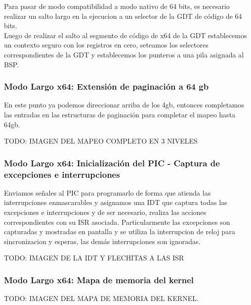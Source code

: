     Para pasar de modo compatibilidad a modo nativo de 64 bits, es necesario realizar un salto largo en la ejecucion a un selector de la GDT de código de 64 bits.\\
    Luego de realizar el salto al segmento de código de x64 de la GDT establecemos un contexto seguro con los registros en cero, seteamos los selectores correspondientes de la GDT y establecemos los punteros a una pila asignada al BSP.

    \subsubsection{Modo Largo x64: Extensión de paginación a 64 gb}

    En este punto ya podemos direccionar arriba de los 4gb, entonces completamos las entradas en las estructuras de paginación para completar el mapeo hasta 64gb.

    TODO: IMAGEN DEL MAPEO COMPLETO EN 3 NIVELES

    \subsubsection{Modo Largo x64: Inicialización del PIC - Captura de excepciones e interrupciones}
	
    Enviamos señales al PIC para programarlo de forma que atienda las interrupciones enmascarables y asignamos una IDT que captura todas las excepciones e interrupciones y de ser necesario, realiza las acciones correspondientes con su ISR asociada. Particularmente las excepciones son capturadas y mostradas en pantalla y se utiliza la interrupcion de reloj para sincronizacion y esperas, las demás interrupciones son ignoradas.

    TODO: IMAGEN DE LA IDT Y FLECHITAS A LAS ISR

    \subsubsection{Modo Largo x64: Mapa de memoria del kernel}

    TODO: IMAGEN DEL MAPA DE MEMORIA DEL KERNEL.
